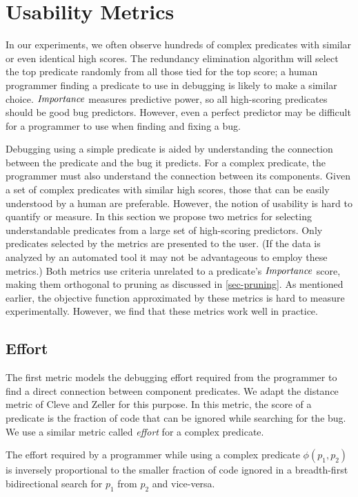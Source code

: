 
\section{Usability Metrics}
\label{sec-metrics}
In our experiments, we often observe hundreds of complex predicates with similar or even identical high scores.  The redundancy elimination algorithm will select the top predicate randomly from all those tied for the top score; a human programmer finding a predicate to use in debugging is likely to make a similar choice.  $\mathit{Importance}$ measures predictive power, so all high-scoring predicates should be good bug predictors.  However, even a perfect predictor may be difficult for a programmer to use when finding and fixing a bug.

Debugging using a simple predicate is aided by understanding the connection between the predicate and the bug it predicts.  For a complex predicate, the programmer must also understand the connection between its components.  Given a set of complex predicates with similar high scores, those that can be easily understood by a human are preferable.  However, the notion of usability is hard to quantify or measure.  In this section we propose two metrics for selecting understandable predicates from a large set of high-scoring predictors.  Only predicates selected by the metrics are presented to the user.  (If the data is analyzed by an automated tool it may not be advantageous to employ these metrics.)  Both metrics use criteria unrelated to a predicate's $\mathit{Importance}$ score, making them orthogonal to pruning as discussed in \autoref{sec-pruning}.  As mentioned earlier, the objective function approximated by these metrics is hard to measure experimentally.  However, we find that these metrics work well in practice.

\subsection{Effort}

The first metric models the debugging effort required from the programmer to find a direct connection between component predicates.  We adapt the distance metric of Cleve and Zeller \cite{1062522} for this purpose.  In this metric, the score of a predicate is the fraction of code that can be ignored while searching for the bug.  We use a similar metric called \emph{effort} for a complex predicate.

\begin{defn}
\label{def-effort}
The effort required by a programmer while using a complex predicate $\phi(p_1, p_2)$ is inversely proportional to the smaller fraction of code ignored in a breadth-first bidirectional search for $p_1$ from $p_2$ and vice-versa.
\end{defn}


